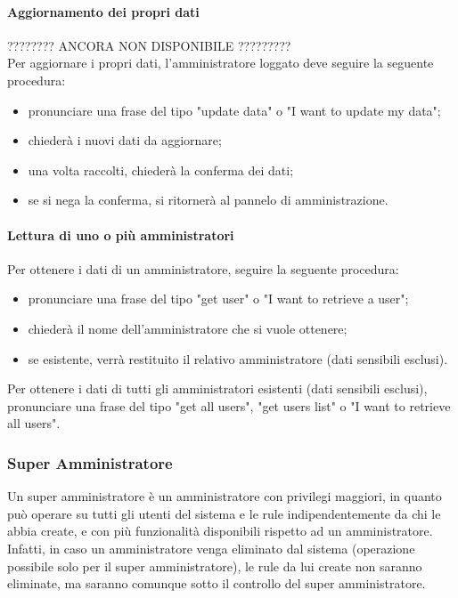 \paragraph{Aggiornamento dei propri dati}
???????? ANCORA NON DISPONIBILE ?????????\\
Per aggiornare i propri dati, l'amministratore loggato deve seguire la seguente procedura:
\begin{itemize}
	\item pronunciare una frase del tipo "update data" o "I want to update my data";
	\item \PROGETTO{} chiederà i nuovi dati da aggiornare;
	\item una volta raccolti, \PROGETTO{} chiederà la conferma dei dati;
	\item se si nega la conferma, si ritornerà al pannelo di amministrazione.
\end{itemize}

\paragraph{Lettura di uno o più amministratori}
Per ottenere i dati di un amministratore, seguire la seguente procedura:
\begin{itemize}
	\item pronunciare una frase del tipo "get user" o "I want to retrieve a user";
	\item \PROGETTO{} chiederà il nome dell'amministratore che si vuole ottenere;
	\item se esistente, verrà restituito il relativo amministratore (dati sensibili esclusi).
\end{itemize}

Per ottenere i dati di tutti gli amministratori esistenti (dati sensibili esclusi), pronunciare una frase del tipo "get all users", "get users list" o "I want to retrieve all users".
\subsubsection{Super Amministratore}\label{superAdmin}
Un super amministratore è un amministratore con privilegi maggiori, in quanto può operare su tutti gli utenti del sistema e le rule indipendentemente da chi le abbia create, e con più funzionalità disponibili rispetto ad un amministratore. \\
Infatti, in caso un amministratore venga eliminato dal sistema (operazione possibile solo per il super amministratore), le rule da lui create non saranno eliminate, ma saranno comunque sotto il controllo del super amministratore. 

